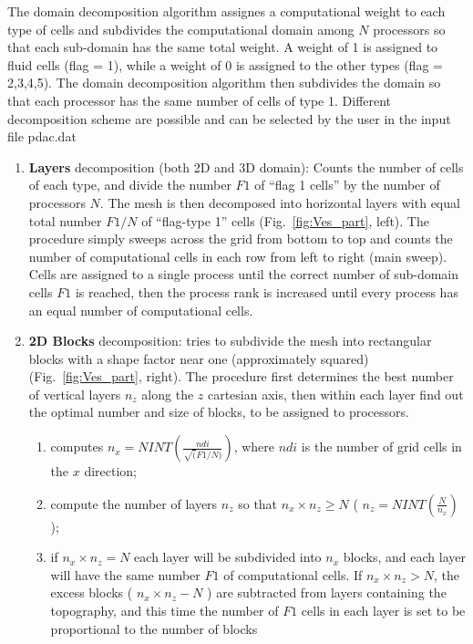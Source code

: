 The domain decomposition algorithm assignes a computational weight to each type 
of cells and subdivides the computational domain
among $N$ processors so that each sub-domain has the same total weight.
A weight of 1 is assigned to fluid cells (flag = 1),
while a weight of 0 is assigned to the other types (flag = 2,3,4,5). 
The domain decomposition algorithm then subdivides the domain so that each processor
has the same number of cells of type 1. Different decomposition scheme are possible
and can be selected by the user in the input file pdac.dat \\
\begin{enumerate}
\item {\bf Layers} decomposition (both 2D and 3D domain): 
Counts the number of cells of each type, and divide the number $F1$ of ``flag 1 cells''
by the number of processors $N$. The mesh is then decomposed into horizontal layers with equal total number
$F1/N$ of ``flag-type 1'' cells (Fig.~\ref{fig:Ves_part}, left). The procedure simply sweeps across
the grid from bottom to top and counts the number of computational cells in each row from
left to right (main sweep). Cells are assigned to a single process until the correct number 
of sub-domain cells $F1$ is reached, then the process rank is increased until every 
process has an equal number of computational cells.
\item {\bf  2D Blocks } decomposition: tries to subdivide the mesh
into rectangular blocks with a shape factor near one (approximately squared) 
(Fig.~\ref{fig:Ves_part}, right). The procedure first determines the best number
of vertical layers $n_z$ along the $z$ cartesian axis, then within each 
layer find out the optimal number and size of blocks, to be assigned to processors.
\begin{enumerate}
\item computes $\displaystyle n_x = NINT\left(\frac{ndi}{\sqrt(F1/N)}\right)$, where $ndi$ is the
number of grid cells in the $x$ direction;
\item compute the number of layers $n_z$ so that $n_x \times n_z \ge N$ 
( $\displaystyle n_z = NINT\left(\frac{N}{n_x}\right)$ );
\item if $n_x \times n_z = N$ each layer will be subdivided into $n_x$ blocks, and each layer
will have the same number $F1$ of computational cells. If $n_x \times n_z > N$, the excess blocks
( $n_x \times n_z - N$ ) are subtracted from layers containing the topography, and this time
the number of $F1$ cells in each layer is set to be proportional to the number of blocks

\end{enumerate}
\end{enumerate}
